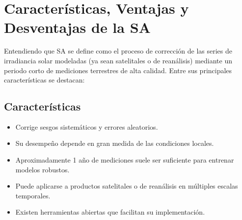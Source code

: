 \documentclass[letterpaper,12pt, twoside]{report}
\providecommand{\DIFdeltex}[1]{{\protect\color{red} \scriptsize #1}} %
\providecommand{\DIFdel}[1]{\texorpdfstring{\DIFdeltex{#1}}{}} %
\begin{document}
\section{\DIFdel{Características, Ventajas y Desventajas de la SA}}
\addtocounter{section}{-1}%

\DIFdel{Entendiendo que SA se define como el proceso de corrección de las series de irradiancia solar modeladas (ya sean satelitales o de reanálisis) mediante un periodo corto de mediciones terrestres de alta calidad. Entre sus principales características se destacan:
}%

\subsection{\DIFdel{Características}}
\addtocounter{subsection}{-1}%

\begin{itemize}%
\item%
\DIFdel{Corrige sesgos sistemáticos y errores aleatorios.
}%
\item%
\DIFdel{Su desempeño depende en gran medida de las condiciones locales.
}%
\item%
\DIFdel{Aproximadamente 1 año de mediciones suele ser suficiente para entrenar modelos robustos.
}%
\item%
\DIFdel{Puede aplicarse a productos satelitales o de reanálisis en múltiples escalas temporales.
}%
\item%
\DIFdel{Existen herramientas abiertas que facilitan su implementación.
}
\end{itemize}%

\end{document}
